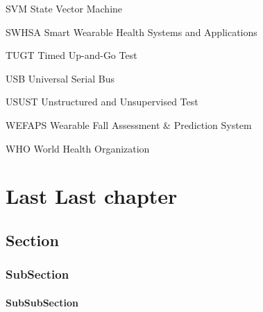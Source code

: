 \documentclass[12pt]{mines-thesis}
\begin{document}
{\begin{abbrv}
	\item[SVM]                   State Vector Machine
	\item[SWHSA]                 Smart Wearable Health Systems and Applications
	\item[TUGT]                  Timed Up-and-Go Test
	\item[USB]                   Universal Serial Bus
	\item[USUST]                 Unstructured and Unsupervised Test
	\item[WEFAPS]                Wearable Fall Assessment \& Prediction System
	\item[WHO]                   World Health Organization
\end{abbrv}
}

\makefrontmatter


	








\chapter{Last Last chapter}
\lipsum[3]
\section{Section}
\lipsum[4]
\subsection{SubSection} 
\lipsum[4]
\subsubsection{SubSubSection}
\lipsum[4-5]

\linespace
	
\end{document}
